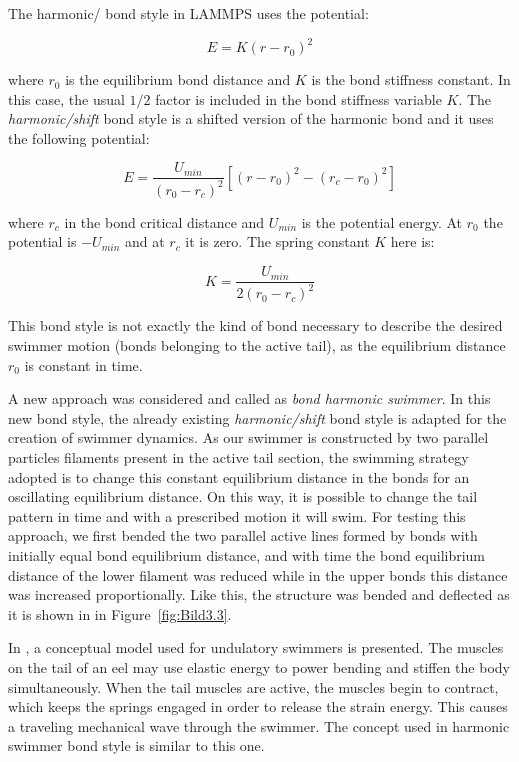 The harmonic/ bond style in LAMMPS uses the potential:

\begin{equation} 
  E = K ( r - r_{0})^2
\end{equation}

where $r_{0}$ is the equilibrium bond distance and $K$ is the bond stiffness constant. In this case, the usual $1/2$ factor is included in the bond stiffness variable $K$. 
The \textit{harmonic/shift} bond style is a shifted version of the harmonic bond and it uses the following potential:

\begin{equation} 
  E = \frac{U_{min}}{( r_{0} - r_{c})^2} [( r - r_{0})^2 -( r_{c} - r_{0})^2]
\end{equation}

where $r_{c}$ in the bond critical distance and $U_{min}$ is the potential energy. At $r_{0}$ the potential is $-U_{min}$ and at $r_{c}$ it is zero. The spring constant $K$
here is:

\begin{equation} 
  K = \frac{U_{min}}{2( r_{0} - r_{c})^2} 
\end{equation}

This bond
style is not exactly the kind of bond necessary to describe the desired swimmer motion (bonds belonging to the active tail), as the equilibrium distance $r_{0}$ is constant in 
time.\par

A new approach was considered and called as \textit{bond harmonic swimmer}. In this new bond style, the already existing \textit{harmonic/shift} bond style is adapted for the creation of
swimmer dynamics. As our swimmer is constructed by two parallel particles filaments present in the active tail section, the swimming strategy adopted is to change this constant
equilibrium distance in the bonds for an oscillating equilibrium distance. On this way, it is possible to change the tail pattern in time and with a prescribed  motion
it will swim. For testing this approach, we first bended the two parallel active lines formed by bonds with initially equal bond equilibrium distance, and with time the bond equilibrium
distance of the lower filament was reduced while in the upper bonds this distance was increased proportionally. Like this, the structure was bended and deflected as it is shown in 
in Figure~\ref{fig:Bild3.3}.\par
In \cite{long_muscles_1998}, a conceptual model used for undulatory swimmers is presented. The muscles on the tail of an eel may use elastic energy to power bending and stiffen the 
body simultaneously. When the tail muscles are active, the muscles begin to contract, which keeps the springs engaged in order to release the strain energy. This causes a traveling
mechanical wave through the swimmer. The concept used in harmonic swimmer bond style is similar to this one.


